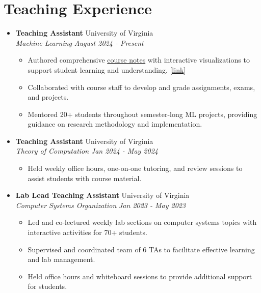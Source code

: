 \documentclass[letterpaper,11pt]{article}
\newcommand{\linkhref}[2]{\textcolor{linkblue}{\href{#1}{#2}}}
\newcommand{\Date}[1]{\textit{\small #1}}
\newcommand{\heading}[4]{
  \textbf{#1} \hfill #2 \\
  \textit{\small#3} \hfill \Date{#4}
}
\begin{document}
\section{Teaching Experience}
\begin{itemize}[label={}, leftmargin=0pt]
    \item \heading{Teaching Assistant}{University of Virginia}
          {Machine Learning}{August 2024 - Present}
          \begin{itemize}
              \item Authored comprehensive \href{https://www.brandonyifanyang.com/notes/ml}{course notes} with interactive visualizations to support student learning and understanding. [\linkhref{https://www.brandonyifanyang.com/notes/ml}{link}]
              \item Collaborated with course staff to develop and grade assignments, exams, and projects.
              \item Mentored 20+ students throughout semester-long ML projects, providing guidance on research methodology and implementation.
          \end{itemize}
    \item \heading{Teaching Assistant}{University of Virginia}
          {Theory of Computation}{Jan 2024 - May 2024}
          \begin{itemize}
              \item Held weekly office hours, one-on-one tutoring, and review sessions to assist students with course material.
          \end{itemize}
    \item \heading{Lab Lead Teaching Assistant}{University of Virginia}
          {Computer Systems Organization}{Jan 2023 - May 2023}
          \begin{itemize}
              \item Led and co-lectured weekly lab sections on computer systems topics with interactive activities for 70+ students.
              \item Supervised and coordinated team of 6 TAs to facilitate effective learning and lab management.
              \item Held office hours and whiteboard sessions to provide additional support for students.
          \end{itemize}
\end{itemize}
\end{document}
